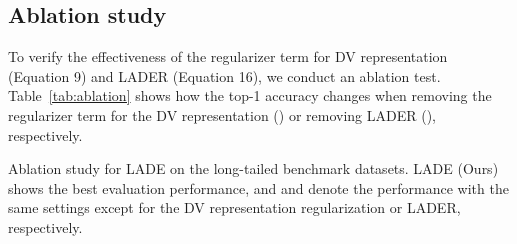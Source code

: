 \documentclass[final]{cvpr}
\begin{document}
\subsection{Ablation study}
To verify the effectiveness of the regularizer term for DV representation (Equation 9) and LADER (Equation 16), we conduct an ablation test.
Table~\ref{tab:ablation} shows how the top-1 accuracy changes when removing the regularizer term for the DV representation () or removing LADER (), respectively.
\begin{table}[h]
\footnotesize
\centering
\caption{Ablation study for LADE on the long-tailed benchmark datasets.
LADE (Ours) shows the best evaluation performance, and  and  denote the performance with the same settings except for the DV representation regularization or LADER, respectively.}


\end{table}
\end{document}
